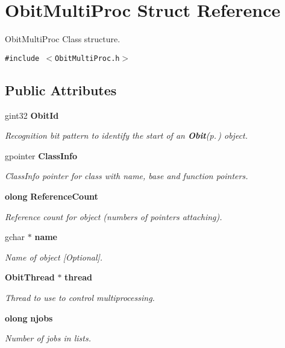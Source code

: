 \section{Obit\-Multi\-Proc Struct Reference}
\label{structObitMultiProc}
Obit\-Multi\-Proc Class structure.  


{\tt \#include $<$Obit\-Multi\-Proc.h$>$}

\subsection*{Public Attributes}
\begin{CompactItemize}
\item 
gint32 {\bf Obit\-Id}
\begin{CompactList}\small\item\em Recognition bit pattern to identify the start of an {\bf Obit}{\rm (p.\,\pageref{structObit})} object. \item\end{CompactList}\item 
gpointer {\bf Class\-Info}
\begin{CompactList}\small\item\em Class\-Info pointer for class with name, base and function pointers. \item\end{CompactList}\item 
{\bf olong} {\bf Reference\-Count}
\begin{CompactList}\small\item\em Reference count for object (numbers of pointers attaching). \item\end{CompactList}\item 
gchar $\ast$ {\bf name}
\begin{CompactList}\small\item\em Name of object [Optional]. \item\end{CompactList}\item 
{\bf Obit\-Thread} $\ast$ {\bf thread}
\begin{CompactList}\small\item\em Thread to use to control multiprocessing. \item\end{CompactList}\item 
{\bf olong} {\bf njobs}
\begin{CompactList}\small\item\em Number of jobs in lists. \item\end{CompactList}\item 

\end{CompactItemize}
